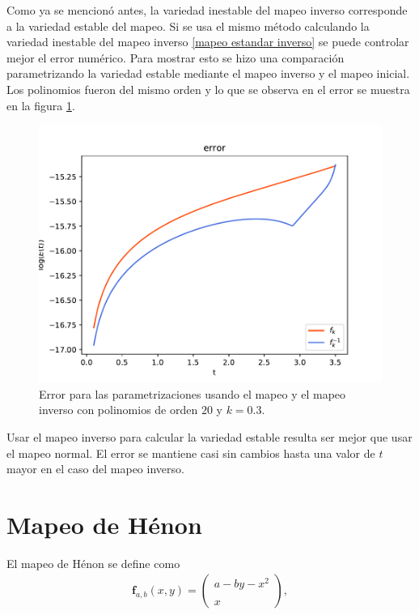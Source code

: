 Como ya se mencionó antes, la variedad inestable del mapeo inverso corresponde a la variedad estable del mapeo. Si se usa el mismo método calculando la variedad inestable del mapeo inverso \eqref{mapeo estandar inverso} se puede controlar mejor el error numérico. Para mostrar esto se hizo una comparación parametrizando la variedad estable mediante el mapeo inverso y el mapeo inicial. Los polinomios fueron del mismo orden y lo que se observa en el error se muestra en la figura \ref{erroresinverso}.


\begin{figure}[H]
\centering
\includegraphics[scale=0.7]{error_inversa}
\caption{Error para las parametrizaciones usando el mapeo y el mapeo inverso con polinomios de orden $20$ y $k=0.3$. }
\label{erroresinverso}
\end{figure}

Usar el mapeo inverso para calcular la variedad estable resulta ser mejor que usar el mapeo normal. El error se mantiene casi sin cambios hasta una valor de $t$ mayor en el caso del mapeo inverso. 




\label{henon-seccion}\section{Mapeo de Hénon}
El mapeo de Hénon se define como \cite{devaney}
\begin{eqnarray}
\mathbf{f}_{a,b}(x,y)=\left( \begin{array}{lcc}
             a-by-x^{2}\\
             \\ x
             \end{array}
             \right), \label{Henon}
\end{eqnarray}

